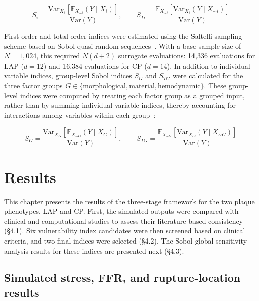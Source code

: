 \documentclass[master,english,final]{kaist-ucs}
\begin{document}
\begin{equation}
S_i = \frac{\mathrm{Var}_{X_i}\!\left[\mathbb{E}_{X_{\sim i}}(Y\mid X_i)\right]}{\mathrm{Var}(Y)}, \qquad S_{Ti} = \frac{\mathbb{E}_{X_{\sim i}}\!\left[\mathrm{Var}_{X_i}(Y\mid X_{\sim i})\right]}{\mathrm{Var}(Y)}
\end{equation}

First-order and total-order indices were estimated using the Saltelli sampling scheme based on Sobol quasi-random sequences~\cite{saltelli2002sobol, saltelli2010variance}. With a base sample size of $N=1{,}024$, this required $N(d+2)$ surrogate evaluations: 14{,}336 evaluations for LAP ($d=12$) and 16{,}384 evaluations for CP ($d=14$). In addition to individual-variable indices, group-level Sobol indices $S_G$ and $S_{TG}$ were calculated for the three factor groups $G\in\{\mathrm{morphological, material, hemodynamic}\}$. These group-level indices were computed by treating each factor group as a grouped input, rather than by summing individual-variable indices, thereby accounting for interactions among variables within each group~\cite{saltelli2008}:

\begin{equation}
S_G = \frac{\mathrm{Var}_{X_G}\!\left[\mathbb{E}_{X_{\sim G}}(Y\mid X_G)\right]}{\mathrm{Var}(Y)}, \qquad S_{TG} = \frac{\mathbb{E}_{X_{\sim G}}\!\left[\mathrm{Var}_{X_G}(Y\mid X_{\sim G})\right]}{\mathrm{Var}(Y)}
\end{equation}


\chapter{Results}

This chapter presents the results of the three-stage framework for the two plaque phenotypes, LAP and CP. First, the simulated outputs were compared with clinical and computational studies to assess their literature-based consistency (\S4.1). Six vulnerability index candidates were then screened based on clinical criteria, and two final indices were selected (\S4.2). The Sobol global sensitivity analysis results for these indices are presented next (\S4.3).

\section{Simulated stress, FFR, and rupture-location results}
\end{document}
